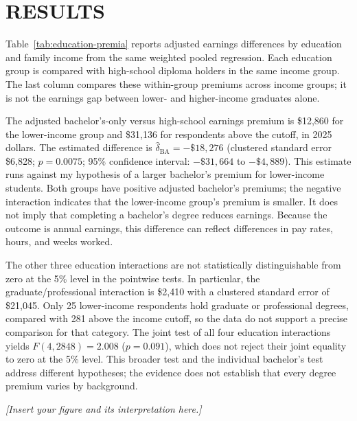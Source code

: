 \documentclass[12pt,letterpaper]{article}
\begin{document}
\section*{RESULTS}
Table~\ref{tab:education-premia} reports adjusted earnings differences by education
and family income from the same weighted pooled regression. Each education group
is compared with high-school diploma holders in the same income group. The last
column compares these within-group premiums across income groups; it is not the
earnings gap between lower- and higher-income graduates alone.\newline


The adjusted bachelor's-only versus high-school earnings premium is \$12,860 for
the lower-income group and \$31,136 for respondents above the cutoff, in 2025 dollars.
The estimated difference is $\hat\delta_{\mathrm{BA}}=-\$18,276$
(clustered standard error \$6,828; $p=0.0075$; 95\% confidence interval:
$-\$31,664$ to $-\$4,889$). This estimate runs against my hypothesis of a larger
bachelor's premium for lower-income students. Both groups have positive adjusted
bachelor's premiums; the negative interaction indicates that the lower-income
group's premium is smaller. It does not imply that completing a bachelor's degree
reduces earnings. Because the outcome is annual earnings, this difference can
reflect differences in pay rates, hours, and weeks worked.\newline

The other three education interactions are not statistically distinguishable from
zero at the 5\% level in the pointwise tests. In particular, the graduate/professional
interaction is \$2,410 with a clustered standard error of \$21,045. Only 25
lower-income respondents hold graduate or professional degrees, compared with
281 above the income cutoff, so the data do not support a precise comparison for
that category. The joint test of all four education interactions yields
$F(4,2848)=2.008$ ($p=0.091$), which does not reject their joint equality to zero
at the 5\% level. This broader test and the individual bachelor's test address
different hypotheses; the evidence does not establish that every degree premium
varies by background.\newline

\textit{[Insert your figure and its interpretation here.]}
\end{document}
